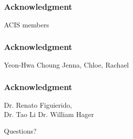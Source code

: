 \documentclass[red]{beamer}
\begin{document}
\begin{frame}
\frametitle{Acknowledgment}
\begin{center}
\huge ACIS members
\end{center}
\end{frame}

\begin{frame}
\frametitle{Acknowledgment}
\begin{center}
\huge Yeon-Hwa Choung
      Jenna, Chloe, Rachael
\end{center}
\end{frame}

\begin{frame}
\frametitle{Acknowledgment}
\begin{center}
\huge Dr. Renato Figuierido, \\
Dr. Tao Li
Dr. William Hager
\end{center}
\end{frame}
\begin{frame}
\begin{center}
\centering                        \huge Questions?
\end{center}
\end{frame}
\end{document}
